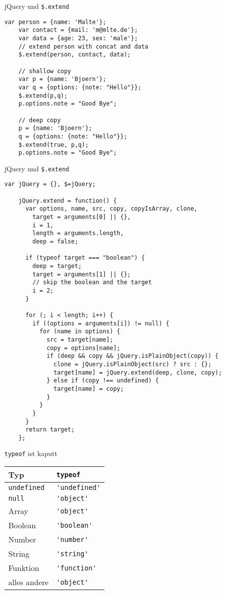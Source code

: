 \begin{frame}[fragile]{jQuery und \texttt{\$.extend}}
  \begin{lstlisting}[gobble=4]
    var person = {name: 'Malte'};
    var contact = {mail: 'm@mlte.de'};
    var data = {age: 23, sex: 'male'};
    // extend person with concat and data
    $.extend(person, contact, data);
    
    // shallow copy
    var p = {name: 'Bjoern'};
    var q = {options: {note: "Hello"}};
    $.extend(p,q);
    p.options.note = "Good Bye";
    
    // deep copy
    p = {name: 'Bjoern'};
    q = {options: {note: "Hello"}};
    $.extend(true, p,q);
    p.options.note = "Good Bye";
  \end{lstlisting}
\end{frame}

\begin{frame}[fragile]{jQuery und \texttt{\$.extend}}
  \begin{lstlisting}[gobble=4,basicstyle=\ttfamily\tiny]
    var jQuery = {}, $=jQuery;
    
    jQuery.extend = function() {
      var options, name, src, copy, copyIsArray, clone,
        target = arguments[0] || {},
        i = 1,
        length = arguments.length,
        deep = false;
    
      if (typeof target === "boolean") {
        deep = target;
        target = arguments[1] || {};
        // skip the boolean and the target
        i = 2;
      }
    
      for (; i < length; i++) {
        if ((options = arguments[i]) != null) {
          for (name in options) {
            src = target[name];
            copy = options[name];
            if (deep && copy && jQuery.isPlainObject(copy)) {
              clone = jQuery.isPlainObject(src) ? src : {};
              target[name] = jQuery.extend(deep, clone, copy);
            } else if (copy !== undefined) {
              target[name] = copy;
            }
          }
        }
      }
      return target;
    };
  \end{lstlisting}
\end{frame}

\begin{frame}[fragile]{\texttt{typeof} ist kaputt}
  \begin{tabular}{ll}
    Typ & \lstinline-typeof- \\ \hline
    \lstinline-undefined- & \lstinline-'undefined'- \\
    \lstinline-null- & \lstinline-'object'- \\
    Array & \lstinline-'object'- \\
    Boolean & \lstinline-'boolean'- \\
    Number & \lstinline-'number'- \\
    String & \lstinline-'string'- \\
    Funktion & \lstinline-'function'- \\
    alles andere & \lstinline-'object'-
  \end{tabular}
\end{frame}

